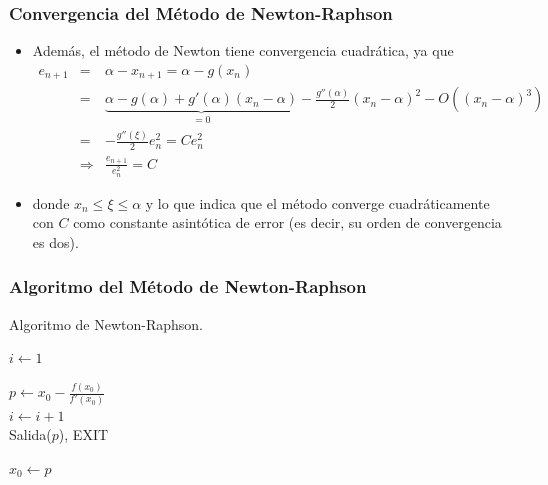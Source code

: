 \documentclass{beamer}
\begin{document}
\begin{frame}
  \frametitle{Convergencia del M\'etodo de Newton-Raphson}
  \begin{itemize}
    \item<1-> Adem\'as, el m\'etodo de Newton tiene convergencia cuadr\'atica, ya que
    \small{
    \begin{eqnarray}
    \nonumber e_{n+1} & = & \alpha - x_{n+1} = \alpha - g(x_n)\\
    \nonumber & = & \underbrace{\alpha -g(\alpha)+g'(\alpha)(x_n-\alpha)}_{=0} - \frac{g''(\alpha)}{2}(x_n -
    \alpha)^2 - O((x_n - \alpha)^3)\\
    \nonumber & = & - \frac{g''(\xi)}{2}e_n^2 = Ce_n^2\\
    \nonumber & \Rightarrow & \frac{e_{n+1}}{e_n^2}  =  C
    \end{eqnarray}}
    \item<2-> donde $x_n \leq \xi \leq \alpha$ y lo que indica que el m\'etodo converge cuadr\'aticamente con $C$ como constante
    asint\'otica de error (es decir, su orden de convergencia es dos).
    \end{itemize}
  \end{frame}     
\begin{frame}
  \frametitle{Algoritmo del M\'etodo de Newton-Raphson}
  \begin{algorithm}[H]
    \caption{Algoritmo de Newton-Raphson.}
    $i \leftarrow 1$\\
    {
     $\displaystyle p \leftarrow x_0-\frac{f(x_0)}{f'(x_0)}$\\
     $i \leftarrow i +1$\\
     {
       Salida($p$), \quad    EXIT\\
     }
     
     $x_0  \leftarrow p$\\
    }    
   \end{algorithm}
\end{frame}
\end{document}
